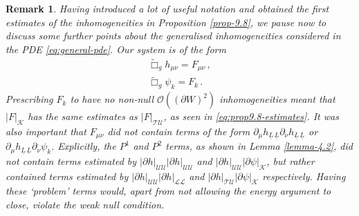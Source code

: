 \documentclass[11pt, a4paper]{amsart}
\numberwithin{equation}{section}
\newtheorem{remark}[theorem]{Remark}
\numberwithin{theorem}{section}
\newcommand{\p}{\partial}
\newcommand{\mn}{{\mu \nu}}
\newcommand{\lbar}{\underline{L}}
\newcommand{\tbox}{\widetilde{\Box}}
\newcommand{\UU}{{\mathcal{U} \mathcal{U}}}
\newcommand{\LL}{{\mathcal{L} \mathcal{L}}}
\newcommand{\TU}{{\mathcal{T} \mathcal{U}}}
\newcommand{\K}{\mathcal{K}}
\begin{document}
\begin{remark} \label{remark:loizelet}
\normalfont
Having introduced a lot of useful notation and obtained the first estimates of the inhomogeneities in Proposition \ref{prop-9.8}, we pause now to discuss some further points about the generalised inhomogeneities considered in the PDE \eqref{eq:general-pde}. Our system is of the form
\begin{equation} \label{remark:general-pde}
\begin{split}
\tbox_g h_\mn = F_\mn \,, \\
\tbox_g \psi_k = F_k \,.\end{split}
\end{equation}
Prescribing $F_k$ to have no non-null $\mathcal{O}((\p W)^2)$ inhomogeneities meant that  $\vert F \vert_\K$ has the same estimates as $\vert F \vert_\TU$, as seen in \eqref{eq:prop9.8-estimates}. It was also important that $F_\mn$ did not contain terms of the form $\p_\mu h_{\lbar \, \lbar} \p_\nu h_{\lbar \, \lbar}$ or $\p_\mu h_{\lbar \, \lbar} \p_\nu \psi_k$. Explicitly, the $P^1$ and $P^2$ terms, as shown in Lemma \ref{lemma-4.2}, did not contain terms estimated by $\vert \p h \vert_\UU \vert \p h \vert_\UU$ and $\vert \p h \vert_\UU \vert \p \psi \vert_\K$, but rather contained terms estimated by $\vert \p h \vert _\UU \vert \p h \vert_\LL$ and $\vert \p h \vert_\TU \vert \p \psi \vert_\K$ respectively. Having these `problem' terms would, apart from not allowing the energy argument to close, violate the weak null condition. 
 

\end{remark}
\end{document}
